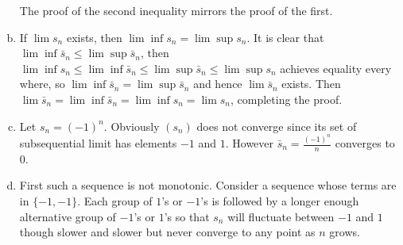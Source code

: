 \documentclass[12pt,lettersize]{article}
\theoremstyle{remark}
\begin{document}
\begin{enumerate}[(a)]
		The proof of the second inequality mirrors the proof of the first.
		\item If $\lim s_n$ exists, then $\lim\inf s_n=\lim\sup s_n$. It is clear that $\lim\inf\bar{s}_n\leq\lim\sup\bar{s}_n$, then $\lim\inf s_n\leq\lim\inf\bar{s}_n\leq\lim\sup\bar{s}_n\leq\lim\sup s_n$ achieves equality every where, so $\lim\inf\bar{s}_n=\lim\sup\bar{s}_n$ and hence $\lim\bar{s}_n$ exists. Then $\lim\bar{s}_n=\lim\inf\bar{s}_n=\lim\inf s_n=\lim s_n$, completing the proof.
		\item Let $s_n=(-1)^n$. Obviously $(s_n)$ does not converge since its set of subsequential limit has elements $-1$ and $1$. However $\bar{s}_n=\frac{(-1)^n}{n}$ converges to $0$.
		\item First such a sequence is not monotonic. Consider a sequence whose terms are in $\{-1, -1\}$. Each group of $1$'s or $-1$'s is followed by a longer enough alternative group of $-1$'s or $1$'s so that $s_n$ will fluctuate between $-1$ and $1$ though slower and slower but never converge to any point as $n$ grows. 
	\end{enumerate}
	\newpage
	
\end{document}
